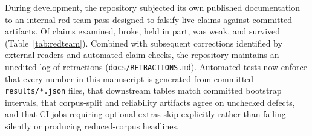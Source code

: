\documentclass[11pt]{article}
\begin{document}
During development, the repository subjected its own published documentation to an internal
red-team pass designed to falsify live claims against committed artifacts. Of \rtClaims{} claims
examined, \rtBroken{} broke, \rtPartial{} held in part, \rtWeak{} was weak, and \rtSurvives{}
survived (Table~\ref{tab:redteam}). Combined with \nRedTeamFoundAfter{} subsequent corrections
identified by external readers and automated claim checks, the repository maintains an unedited log
of \nRetractions{} retractions (\texttt{docs/RETRACTIONS.md}). Automated tests now enforce that
every number in this manuscript is generated from committed \texttt{results/*.json} files, that
downstream tables match committed bootstrap intervals, that corpus-split and reliability artifacts
agree on unchecked defects, and that CI jobs requiring optional extras skip explicitly rather than
failing silently or producing reduced-corpus headlines.

\begin{table}[t]\centering\footnotesize

\caption{The \rtBroken{} claims broken by the internal red team, recorded verbatim as originally
published. Numbers in this table are the retracted claims, not current results.}
\label{tab:redteam}
\end{table}
\end{document}
